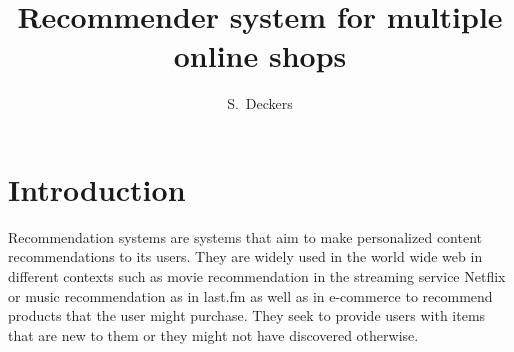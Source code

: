 \documentclass[10pt]{reportMaster}
\title{Recommender system for multiple online shops}
\author{S.\ Deckers}
\date{} %
\begin{document}
\maketitle

\tableofcontents

\listoffigures
\listoftables
\listofalgorithms

\chapter{Introduction}
Recommendation systems are systems that aim to make personalized content recommendations to its users.
They are widely used in the world wide web in different contexts such as movie recommendation in the streaming service Netflix or music recommendation as in last.fm as well as in e-commerce to recommend products that the user might purchase.
They seek to provide users with items that are new to them or they might not have discovered otherwise.
\end{document}

